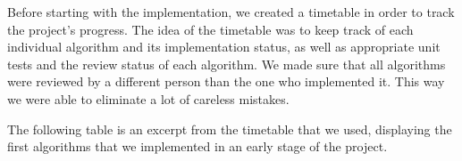 Before starting with the implementation, we created a timetable in order to track the project's progress. The idea of the timetable was to keep track of each individual algorithm and its implementation status, as well as appropriate unit tests and the review status of each algorithm. We made sure that all algorithms were reviewed by a different person than the one who implemented it. This way we were able to eliminate a lot of careless mistakes.

The following table is an excerpt from the timetable that we used, displaying the first algorithms that we implemented in an early stage of the project.

